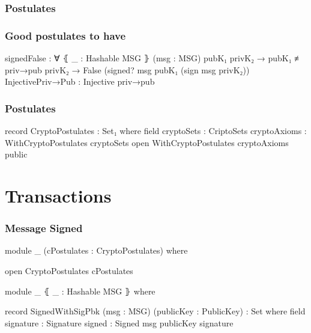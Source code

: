 \documentclass{beamer}
\begin{document}
\begin{frame}
  \frametitle{Postulates}
\end{frame}

\begin{frame}
  \frametitle{Good postulates to have}
\begin{code}
    signedFalse : ∀ ⦃ _ : Hashable MSG ⦄ (msg : MSG)
      pubK₁ privK₂ → pubK₁ ≢ priv→pub privK₂
      → False (signed? msg pubK₁ (sign msg privK₂))
    InjectivePriv→Pub : Injective priv→pub
\end{code}
\end{frame}

\begin{frame}
  \frametitle{Postulates}
\begin{code}
record CryptoPostulates : Set₁ where
  field
    cryptoSets : CriptoSets
    cryptoAxioms : WithCryptoPostulates cryptoSets
  open WithCryptoPostulates cryptoAxioms public

\end{code}
\end{frame}

\section{Transactions}

\begin{frame}
  \frametitle{Message Signed}
\begin{code}
module _ (cPostulates : CryptoPostulates) where

  open CryptoPostulates cPostulates

  module _ ⦃ _ : Hashable MSG ⦄ where

    record SignedWithSigPbk  (msg : MSG)
      (publicKey : PublicKey) : Set where
      field
        signature : Signature
        signed    : Signed msg publicKey signature

\end{code}
\end{frame}
\end{document}
